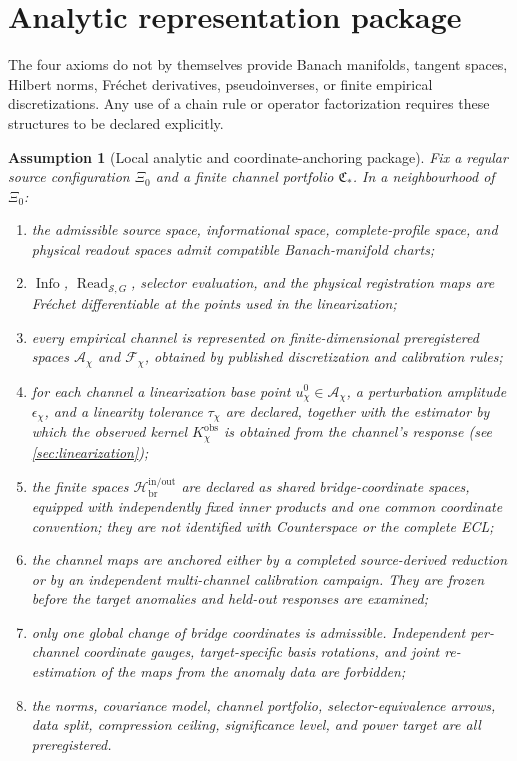 \documentclass[11pt]{article}
\newtheorem{assumption}{Assumption}
\newcommand{\Sset}{\mathcal{S}}
\newcommand{\Info}{\operatorname{Info}}
\newcommand{\Read}{\operatorname{Read}_{\Sset,G}}
\begin{document}
\section{Analytic representation package}

The four axioms do not by themselves provide Banach manifolds, tangent spaces, Hilbert norms, Fr\'echet derivatives, pseudoinverses, or finite empirical discretizations. Any use of a chain rule or operator factorization requires these structures to be declared explicitly.

\begin{assumption}[Local analytic and coordinate-anchoring package]
Fix a regular source configuration \(\Xi_0\) and a finite channel portfolio \(\mathfrak C_*\). In a neighbourhood of \(\Xi_0\):
\begin{enumerate}[leftmargin=1.55em]
\item the admissible source space, informational space, complete-profile space, and physical readout spaces admit compatible Banach-manifold charts;
\item \(\Info\), \(\Read\), selector evaluation, and the physical registration maps are Fr\'echet differentiable at the points used in the linearization;
\item every empirical channel is represented on finite-dimensional preregistered spaces \(\mathcal A_{\chi}\) and \(\mathcal F_{\chi}\), obtained by published discretization and calibration rules;
\item for each channel a \emph{linearization base point} \(u_{\chi}^{0}\in\mathcal A_{\chi}\), a perturbation amplitude \(\epsilon_{\chi}\), and a linearity tolerance \(\tau_{\chi}\) are declared, together with the estimator by which the observed kernel \(K_{\chi}^{\mathrm{obs}}\) is obtained from the channel's response (see \cref{sec:linearization});
\item the finite spaces \(\mathcal H_{\mathrm{br}}^{\mathrm{in/out}}\) are declared as shared bridge-coordinate spaces, equipped with independently fixed inner products and one common coordinate convention; they are not identified with Counterspace or the complete ECL;
\item the channel maps are anchored either by a completed source-derived reduction or by an independent multi-channel calibration campaign. They are frozen before the target anomalies and held-out responses are examined;
\item only one global change of bridge coordinates is admissible. Independent per-channel coordinate gauges, target-specific basis rotations, and joint re-estimation of the maps from the anomaly data are forbidden;
\item the norms, covariance model, channel portfolio, selector-equivalence arrows, data split, compression ceiling, significance level, and power target are all preregistered.
\end{enumerate}
\label{ass:analytic_package}
\end{assumption}
\end{document}
